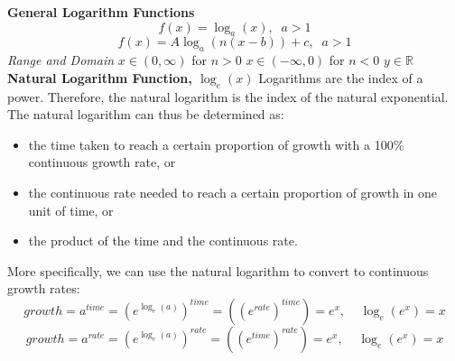 \documentclass{article}
\begin{document}
				\textbf{General Logarithm Functions}
				\[f(x)=\log_a(x),\;\;a>1\]
				\[f(x)=A\log_a(n(x-b))+c,\;\;a>1\]
				\textit{Range and Domain}\newline
				$x\in(0,\infty)$ for $n>0$\newline
				$x\in(-\infty,0)$ for $n<0$\newline
				$y\in\mathbb{R}$\newline\newline
				\textbf{Natural Logarithm Function, $\log_e(x)$}\newline
				Logarithms are the index of a power. Therefore, the natural logarithm is the index of the natural exponential. The natural logarithm can thus be determined as:
				\begin{itemize}
					\item the time taken to reach a certain proportion of growth with a 100\% continuous growth rate, or
					\item the continuous rate needed to reach a certain proportion of growth in one unit of time, or
					\item the product of the time and the continuous rate.
				\end{itemize}
				More specifically, we can use the natural logarithm to convert to continuous growth rates:
				\[growth=a^{time}=\left(e^{\log_e(a)}\right)^{time}=\left((e^{rate})^{time}\right)=e^x,\;\;\;\;\log_e(e^x)=x\]
				\[growth=a^{rate}=\left(e^{\log_e(a)}\right)^{rate}=\left((e^{time})^{rate}\right)=e^x,\;\;\;\;\log_e(e^x)=x\]
				\newpage
\end{document}
